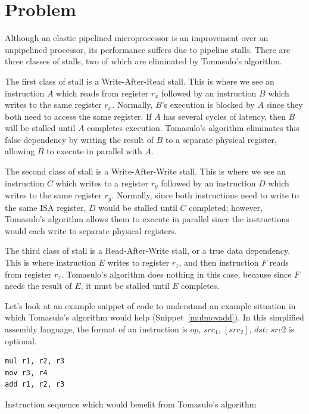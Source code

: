 \documentclass[12pt]{article}
\begin{document}
\section{Problem\label{sec:problem}}
Although an elastic pipelined microprocessor is an improvement over an unpipelined processor, its performance suffers due to pipeline stalls.
There are three classes of stalls, two of which are eliminated by Tomasulo's algorithm.

The first class of stall is a Write-After-Read stall. This is where we see an instruction $A$ which reads from register $r_x$ followed by an instruction
$B$ which writes to the same register $r_x$. Normally, $B$'s execution is blocked by $A$ since they both need to access the same register. If $A$ has
several cycles of latency, then $B$ will be stalled until $A$ completes execution. Tomasulo's algorithm eliminates this false dependency by writing the
result of $B$ to a separate physical register, allowing $B$ to execute in parallel with $A$.

The second class of stall is a Write-After-Write stall. This is where we see an instruction $C$ which writes to a register $r_y$ followed by an instruction
$D$ which writes to the same register $r_y$. Normally, since both instructions need to write to the same ISA register, $D$ would be stalled until $C$ completed;
however, Tomasulo's algorithm allows them to execute in parallel since the instructions would each write to separate physical registers.

The third class of stall is a Read-After-Write stall, or a true data dependency. This is where instruction $E$ writes to register $r_z$, and then instruction $F$
reads from register $r_z$. Tomasulo's algorithm does nothing in this case, because since $F$ needs the result of $E$, it must be stalled until $E$ completes.

Let's look at an example snippet of code to understand an example situation in which Tomasulo's algorithm would help (Snippet~\ref{mulmovadd}).
In this simplified assembly language, the format of an instruction is $op$, $src_1$, $\left[src_2\right]$, $dst$; $src2$ is optional.

\begin{snippet}
\begin{verbatim}
mul r1, r2, r3
mov r3, r4
add r1, r2, r3
\end{verbatim}
\caption{Instruction sequence which would benefit from Tomasulo's algorithm}
\label{mulmovadd}
\end{snippet}
\end{document}

